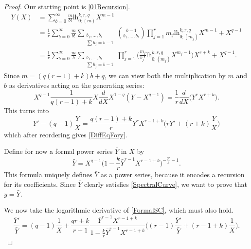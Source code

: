 \documentclass[10pt,a4paper,oneside,no-math,reqno]{amsart}%
\theoremstyle{plain}
\theoremstyle{definition}
\theoremstyle{remark}
\numberwithin{equation}{section}
\newcommand{\1}{\mathds{1}}
\newcommand{\<}{\langle}
\renewcommand{\>}{\rangle}
\newcommand{\lh}{\mathord{\mathrm{l\!h}}}
\begin{document}
\begin{proof}
	Our starting point is \cref{01Recursion}.
	\begin{equation}
		\begin{split}
			Y(X) 
		      &
		      =
		      \sum_{b=0}^\infty \frac{m}{b!} \lh^{k,r,q}_{0;(m)} X^{m-1}
		      \\
		      &
		      =
    		\frac{1}{r} \sum_{b=0}^\infty \frac{m}{b!} \sum_{\substack{b_1, \dotsc, b_{r} \\ \sum b_j = b - 1}} \binom{b - 1}{b_1, \dotsc, b_{r}} \prod_{j=1}^{r} m_j \lh^{k,r,q}_{0;(m_j)} X^{m-1} + X^{q-1}
		      \\
		      &
		      =
		      \frac{1}{r} \sum_{b=0}^\infty \frac{m}{b} \sum_{\substack{b_1, \dotsc, b_{r} \\ \sum b_j = b - 1}}  \prod_{j=1}^{r} \Big( \frac{m_j}{b_j!} \lh^{k,r,q}_{0;(m_j)} X^{m_j-1} \Big) X^{r+k} + X^{q-1} .
		\end{split}
	\end{equation}
	Since $ m = (q(r-1)+k)b+q$, we can view both the multiplication by $m $ and $b$ as derivatives acting on the generating series:
	\begin{equation}
		X^{q-1} \frac{1}{q(r-1)+k} X \frac{d}{dX} X^{1-q} (Y - X^{q-1})  = \frac{1}{r} \frac{d}{dX} \Big( Y^{r} X^{r+k}\Big).
	\end{equation}
	This turns into
	\begin{equation}
		Y' - (q-1) \frac{Y}{X}
		=
		\frac{q(r-1)+k}{r} Y^{r} X^{r-1+k} \Big(r Y' + (r+k) \frac{Y}{X} \Big)
	\end{equation}
	which after reordering gives \cref{DiffEqFory}.\par
	Define for now a formal power series $\bar{Y}$ in $ X$ by
	\begin{equation}\label{FormalSC}
		\bar{Y} = X^{q-1}\big( 1 - \frac{k}{r} \bar{Y}^{r-1} X^{r-1+k} \big)^{- \frac{qr}{k} - 1}  .
	\end{equation}
	This formula uniquely defines $\bar{Y}$ as a power series, because it encodes a recursion for its coefficients. Since $\bar{Y}$ clearly satisfies \eqref{SpectralCurve}, we want to prove that $ y = \bar{Y}$.\par
	We now take the logarithmic derivative of \eqref{FormalSC}, which must also hold.
	\begin{equation}\label{DerivativeSC}
		\frac{\bar{Y}'}{\bar{Y}} 
        =
        (q-1) \frac{1}{X} + \frac{qr+k}{r+1} \frac{\bar{Y}^{r-1} X^{r-1+k} }{ 1 - \frac{k}{r} \bar{Y}^{r-1} X^{r-1+k} } \Big( (r-1) \frac{\bar{Y}'}{\bar{Y}} + (r-1+k) \frac{1}{X} \Big).

\end{equation}
\end{proof}
\end{document}

